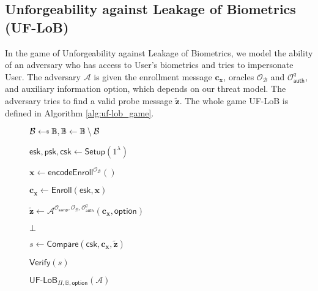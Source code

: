 \fi

\newpage


\subsection{Unforgeability against Leakage of Biometrics (UF-LoB)}
\label{sec:uf-lob_game}

In the game of Unforgeability against Leakage of Biometrics, we model the ability of an adversary who has access to \textsf{User}'s biometrics and tries to impersonate \textsf{User}. The adversary $\mathcal{A}$ is given the enrollment message $\mathbf{c_x}$, oracles $\mathcal{O}_\mathcal{B}$ and $\mathcal{O}_\textsf{auth}^q$, and auxiliary information \textsf{option}, which depends on our threat model. The adversary tries to find a valid probe message $\mathbf{\tilde{z}}$. The whole game \textsf{UF-LoB} is defined in Algorithm \ref{alg:uf-lob_game}.

\begin{figure}[h]
\centering
	\begin{minipage}[t]{0.6\linewidth}
	\centering
	\begin{algorithm}[H]
	\caption{$\textsf{UF-LoB}_{\Pi, \mathbb{B}, \textsf{option}}(\mathcal{A})$}
	\label{alg:uf-lob_game}
	\begin{algorithmic}[1]
		\State $\mathcal{B} \getsdollar \mathbb{B}, \mathbb{B} \gets \mathbb{B} \setminus \mathcal{B}$

		\State $\textsf{esk}, \textsf{psk}, \textsf{csk} \gets \textsf{Setup}(1^\lambda)$

		\State $\mathbf{x} \gets \textsf{encodeEnroll}^{\mathcal{O}_{\mathcal{B}}}()$

		\State $\mathbf{c_x} \gets \textsf{Enroll}(\textsf{esk}, \mathbf{x})$
		
		\State ${\mathbf{\tilde{z}}} \gets \mathcal{A}^{ \mathcal{O}_{\textsf{samp}}, \mathcal{O}_{\mathcal{B}}, \mathcal{O}_\textsf{auth}^q } ( \mathbf{c_x}, \textsf{option} )$

		
		\State \Return $\bot$
		
		\EndIf

		\State $s \gets \textsf{Compare}( \textsf{csk}, \mathbf{c_x}, \mathbf{\tilde{z}} )$

		\State \Return $\textsf{Verify}(s)$
	\end{algorithmic}
	\end{algorithm}
	\end{minipage}
	
\label{fig:uf-lob_game}
\end{figure}


